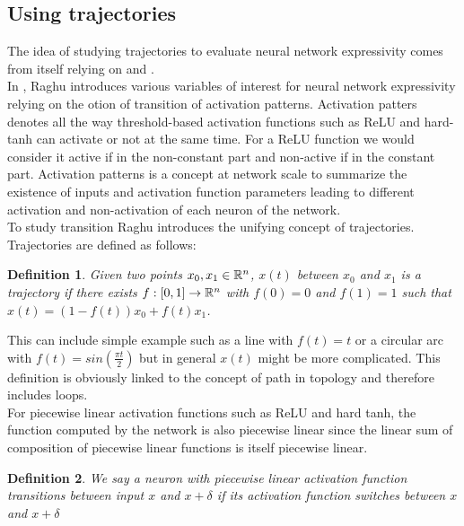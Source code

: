 \documentclass[12pt, a4paper]{article}
\newtheorem{definition}{Definition}
\begin{document}
\subsection{Using trajectories}
\label{sec:using_trajectories}

The idea of studying trajectories to evaluate neural network expressivity comes from \cite{raghu_expressive_2017} itself relying on \cite{poole_exponential_2016} and \cite{pascanu_number_2014}.\\

In \cite{raghu_expressive_2017}, Raghu introduces various variables of interest for neural network expressivity relying on the otion of transition of activation patterns. Activation patters denotes all the way threshold-based activation functions such as ReLU and hard-tanh can activate or not at the same time. For a ReLU function we would consider it active if in the non-constant part and non-active if in the constant part. Activation patterns is a concept at network scale to summarize the existence of inputs and activation function parameters leading to different activation and non-activation of each neuron of the network.\\

To study transition Raghu introduces the unifying concept of trajectories. Trajectories are defined as follows:

\begin{definition}
  Given two points $x_0, x_1 \in \mathbb{R}^n$, $x(t)$ between $x_0$ and $x_1$ is a trajectory if there exists $f: [0,1] \to \mathbb{R}^n$ with $f(0) = 0$ and $f(1) = 1$ such that $x(t) = (1-f(t))x_0 + f(t)x_1$. 
  \label{def:trajectories}
\end{definition}

This can include simple example such as a line with $f(t) = t$ or a circular arc with $f(t) = sin(\frac{\pi t}{2})$ but in general $x(t)$ might be more complicated. This definition is obviously linked to the concept of path in topology and therefore includes loops.\\

For piecewise linear activation functions such as ReLU and hard tanh, the function computed by the network is also piecewise linear since the linear sum of composition of piecewise linear functions is itself piecewise linear.

\begin{definition}
  We say a neuron with piecewise linear activation function transitions between input $x$ and $x+\delta$ if its activation function switches between $x$ and $x+\delta$
\end{definition}
\end{document}

